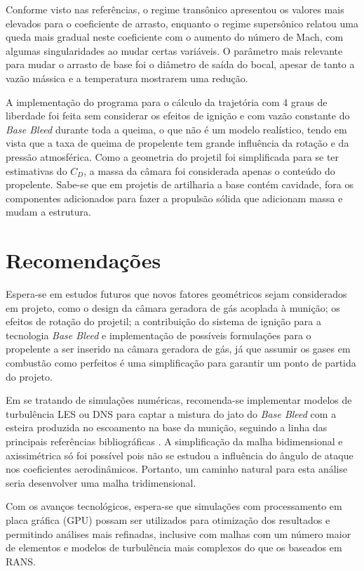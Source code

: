 Conforme visto nas referências, o regime transônico apresentou os valores mais elevados para o coeficiente de arrasto, enquanto o regime supersônico relatou uma queda mais gradual neste coeficiente com o aumento do número de Mach, com algumas singularidades ao mudar certas variáveis. O parâmetro mais relevante para mudar o arrasto de base foi o diâmetro de saída do bocal, apesar de tanto a vazão mássica e a temperatura mostrarem uma redução.

A implementação do programa para o cálculo da trajetória com 4 graus de liberdade foi feita sem considerar os efeitos de ignição e com vazão constante do \textit{Base Bleed} durante toda a queima, o que não é um modelo realístico, tendo em vista que a taxa de queima de propelente tem grande influência da rotação e da pressão atmosférica. Como a geometria do projetil foi simplificada para se ter estimativas do $C_D$, a massa da câmara foi considerada apenas o conteúdo do propelente. Sabe-se que em projetis de artilharia a base contém cavidade, fora os componentes adicionados para fazer a propulsão sólida que adicionam massa e mudam a estrutura.

\section{Recomendações}

Espera-se em estudos futuros que novos fatores geométricos sejam considerados em projeto, como o design da câmara geradora de gás acoplada à munição; os efeitos de rotação do projetil; a contribuição do sistema de ignição para a tecnologia \textit{Base Bleed} e implementação de possíveis formulações para o propelente a ser inserido na câmara geradora de gás, já que assumir os gases em combustão como perfeitos é uma simplificação para garantir um ponto de partida do projeto. 

Em se tratando de simulações numéricas, recomenda-se implementar modelos de turbulência LES ou DNS para captar a mistura do jato do \textit{Base Bleed} com a esteira produzida no escoamento na base da munição, seguindo a linha das principais referências bibliográficas \cite{nicolas-perez_accuracy_2017,Lucena2020}. A simplificação da malha bidimensional e axissimétrica só foi possível pois não se estudou a influência do ângulo de ataque nos coeficientes aerodinâmicos. Portanto, um caminho natural para esta análise seria desenvolver uma malha tridimensional.

Com os avanços tecnológicos, espera-se que simulações com processamento em placa gráfica (GPU) possam ser utilizados para otimização dos resultados e permitindo análises mais refinadas, inclusive com malhas com um número maior de elementos e modelos de turbulência mais complexos do que os baseados em RANS.

